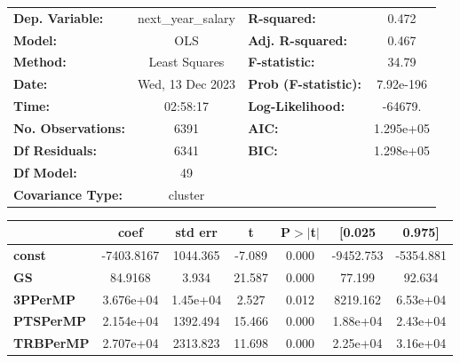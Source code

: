 \begin{center}
\begin{tabular}{lclc}
\toprule
\textbf{Dep. Variable:}       & next\_year\_salary & \textbf{  R-squared:         } &     0.472   \\
\textbf{Model:}               &        OLS         & \textbf{  Adj. R-squared:    } &     0.467   \\
\textbf{Method:}              &   Least Squares    & \textbf{  F-statistic:       } &     34.79   \\
\textbf{Date:}                &  Wed, 13 Dec 2023  & \textbf{  Prob (F-statistic):} & 7.92e-196   \\
\textbf{Time:}                &      02:58:17      & \textbf{  Log-Likelihood:    } &   -64679.   \\
\textbf{No. Observations:}    &         6391       & \textbf{  AIC:               } & 1.295e+05   \\
\textbf{Df Residuals:}        &         6341       & \textbf{  BIC:               } & 1.298e+05   \\
\textbf{Df Model:}            &           49       & \textbf{                     } &             \\
\textbf{Covariance Type:}     &      cluster       & \textbf{                     } &             \\
\bottomrule
\end{tabular}
\begin{tabular}{lcccccc}
                              & \textbf{coef} & \textbf{std err} & \textbf{t} & \textbf{P$> |$t$|$} & \textbf{[0.025} & \textbf{0.975]}  \\
\midrule
\textbf{const}                &   -7403.8167  &     1044.365     &    -7.089  &         0.000        &    -9452.753    &    -5354.881     \\
\textbf{GS}                   &      84.9168  &        3.934     &    21.587  &         0.000        &       77.199    &       92.634     \\
\textbf{3PPerMP}              &    3.676e+04  &     1.45e+04     &     2.527  &         0.012        &     8219.162    &     6.53e+04     \\
\textbf{PTSPerMP}             &    2.154e+04  &     1392.494     &    15.466  &         0.000        &     1.88e+04    &     2.43e+04     \\
\textbf{TRBPerMP}             &    2.707e+04  &     2313.823     &    11.698  &         0.000        &     2.25e+04    &     3.16e+04     \\

\end{tabular}
\end{center}
